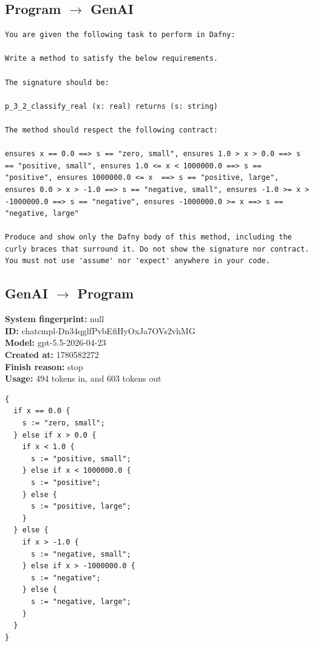 \documentclass{article}
\begin{document}
\subsection*{Program $\rightarrow$ GenAI}
\begin{lstlisting}
You are given the following task to perform in Dafny:

Write a method to satisfy the below requirements.

The signature should be:

p_3_2_classify_real (x: real) returns (s: string)

The method should respect the following contract:

ensures x == 0.0 ==> s == "zero, small", ensures 1.0 > x > 0.0 ==> s == "positive, small", ensures 1.0 <= x < 1000000.0 ==> s == "positive", ensures 1000000.0 <= x  ==> s == "positive, large", ensures 0.0 > x > -1.0 ==> s == "negative, small", ensures -1.0 >= x > -1000000.0 ==> s == "negative", ensures -1000000.0 >= x ==> s == "negative, large"

Produce and show only the Dafny body of this method, including the curly braces that surround it. Do not show the signature nor contract. You must not use 'assume' nor 'expect' anywhere in your code.
\end{lstlisting}
\subsection*{GenAI $\rightarrow$ Program}
\textbf{System fingerprint: }null
\\\textbf{ID: }chatcmpl-Dn34qglfPvbEfiHyOxJa7OVs2vhMG
\\\textbf{Model: }gpt-5.5-2026-04-23
\\\textbf{Created at: }1780582272
\\\textbf{Finish reason: }stop
\\\textbf{Usage: }494 tokens in, and 603 tokens out
\begin{lstlisting}
{
  if x == 0.0 {
    s := "zero, small";
  } else if x > 0.0 {
    if x < 1.0 {
      s := "positive, small";
    } else if x < 1000000.0 {
      s := "positive";
    } else {
      s := "positive, large";
    }
  } else {
    if x > -1.0 {
      s := "negative, small";
    } else if x > -1000000.0 {
      s := "negative";
    } else {
      s := "negative, large";
    }
  }
}
\end{lstlisting}
\end{document}
